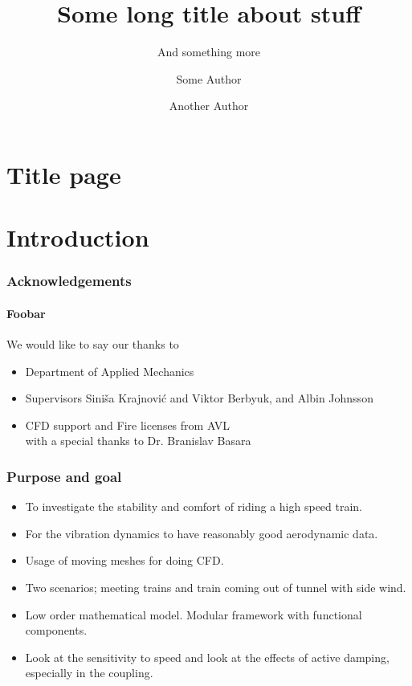 \documentclass[12pt]{beamer}
\title{Some long title about stuff}
\subtitle{And something more}
\author{Some Author \and Another Author}
\institute{Chalmers University of Technology}
\begin{document}
\section{Title page}
\begin{frame}[plain]
 \titlepage
\end{frame}

\section{Introduction}
\begin{frame}
 \frametitle{Acknowledgements}
\framesubtitle{Foobar}

 We would like to say our thanks to
\begin{itemize}
 \item Department of Applied Mechanics
 \item Supervisors Sini\v{s}a Krajnovi\'{c} and Viktor Berbyuk, and Albin Johnsson
 \item CFD support and Fire licenses from AVL\\ with a special thanks to Dr. Branislav Basara
\end{itemize}
\end{frame}

\begin{frame}
 \frametitle{Purpose and goal}
 \begin{itemize}
  \item To investigate the stability and comfort of riding a high speed train.
  \item For the vibration dynamics to have reasonably good aerodynamic data.
  \item Usage of moving meshes for doing CFD.
  \item Two scenarios; meeting trains and train coming out of tunnel with side wind.
  \item Low order mathematical model. Modular framework with functional components.
  \item Look at the sensitivity to speed and look at the effects of active damping, especially in the coupling.
 \end{itemize}
\end{frame}
\end{document}
